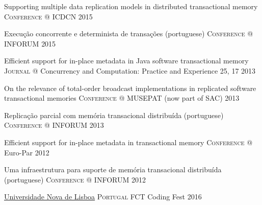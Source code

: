 \documentclass[10pt,a4paper]{article}
\begin{document}
\headedsection
  {Supporting multiple data replication models in distributed transactional memory}
  {\textsc{Conference}} {%
  \headedsubsection
    {@ ICDCN}
    {2015}
    {}
}

\headedsection
  {Execu\c{c}\~{a}o concorrente e determinista de transa\c{c}\~{o}es (portuguese)}
  {\textsc{Conference}} {%
  \headedsubsection
    {@ INFORUM}
    {2015}
    {}
}

\headedsection
  {Efficient support for in-place metadata in Java software transactional memory}
  {\textsc{Journal}} {%
  \headedsubsection
    {@ Concurrency and Computation: Practice and Experience 25, 17}
    {2013}
    {}
}

\headedsection
  {On the relevance of total-order broadcast implementations in replicated software transactional memories}
  {\textsc{Conference}} {%
  \headedsubsection
    {@ MUSEPAT (now part of SAC)}
    {2013}
    {}
}

\headedsection
  {Replica\c{c}\~{a}o parcial com mem\'{o}ria transacional distribu\'{i}da (portuguese)}
  {\textsc{Conference}} {%
  \headedsubsection
    {@ INFORUM}
    {2013}
    {}
}

\headedsection
  {Efficient support for in-place metadata in transactional memory}
  {\textsc{Conference}} {%
  \headedsubsection
    {@ Euro-Par}
    {2012}
    {}
}

\headedsection
  {Uma infraestrutura para suporte de mem\'{o}ria transacional distribu\'{i}da (portuguese)}
  {\textsc{Conference}} {%
  \headedsubsection
    {@ INFORUM}
    {2012}
    {}
}

\spacedhrule{0.5em}{-0.4em}



\headedsection  %
  {\href{http://fct.unl.pt}{Universidade Nova de Lisboa}}
  {\textsc{Portugal}} {%
  \headedsubsection
    {FCT Coding Fest}
    {2016}
    {}
}
\end{document}
